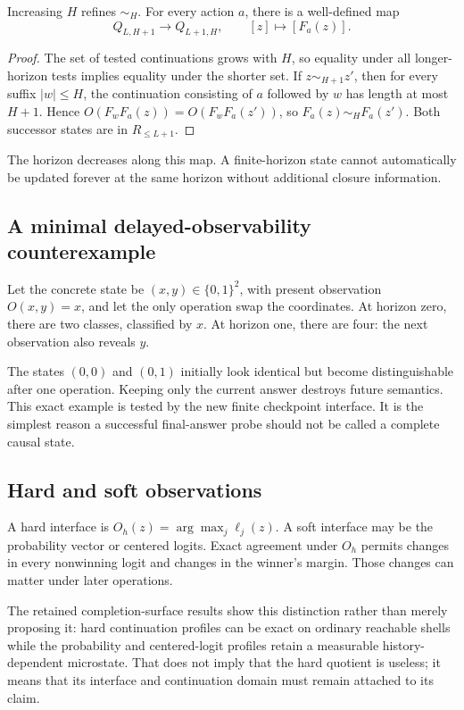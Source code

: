 \documentclass[11pt]{article}
\begin{document}
\begin{proposition}\label{prop:diagonal}
Increasing \(H\) refines \(\sim_H\). For every action \(a\), there is a well-defined map
\[
 Q_{L,H+1}\longrightarrow Q_{L+1,H},\qquad [z]\longmapsto[F_a(z)].
\]
\end{proposition}
\begin{proof}
The set of tested continuations grows with \(H\), so equality under all longer-horizon tests implies equality under the shorter set. If \(z\sim_{H+1}z'\), then for every suffix \(|w|\le H\), the continuation consisting of \(a\) followed by \(w\) has length at most \(H+1\). Hence \(O(F_wF_a(z))=O(F_wF_a(z'))\), so \(F_a(z)\sim_HF_a(z')\). Both successor states are in \(R_{\le L+1}\).
\end{proof}
The horizon decreases along this map. A finite-horizon state cannot automatically be updated forever at the same horizon without additional closure information.

\subsection{A minimal delayed-observability counterexample}
Let the concrete state be \((x,y)\in\{0,1\}^2\), with present observation \(O(x,y)=x\), and let the only operation swap the coordinates. At horizon zero, there are two classes, classified by \(x\). At horizon one, there are four: the next observation also reveals \(y\).

The states \((0,0)\) and \((0,1)\) initially look identical but become distinguishable after one operation. Keeping only the current answer destroys future semantics. This exact example is tested by the new finite checkpoint interface. It is the simplest reason a successful final-answer probe should not be called a complete causal state.

\subsection{Hard and soft observations}
A hard interface is \(O_h(z)=\arg\max_j \ell_j(z)\). A soft interface may be the probability vector or centered logits. Exact agreement under \(O_h\) permits changes in every nonwinning logit and changes in the winner's margin. Those changes can matter under later operations.

The retained completion-surface results show this distinction rather than merely proposing it: hard continuation profiles can be exact on ordinary reachable shells while the probability and centered-logit profiles retain a measurable history-dependent microstate. That does not imply that the hard quotient is useless; it means that its interface and continuation domain must remain attached to its claim. \cite{ncs}
\end{document}
